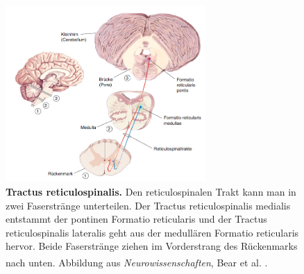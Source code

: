\documentclass[12pt,a4paper,pdftex]{article}
\begin{document}
\begin{figure}[H]
    \centering
    \includegraphics[width=0.68\textwidth]{pictures/Bilder_Laura/reticulospinaler_tract.PNG}
    \caption[Tractus reticulospinalis]{\textbf{Tractus reticulospinalis.} Den reticulospinalen Trakt kann man in zwei Faserstränge unterteilen. Der Tractus reticulospinalis medialis entstammt der pontinen Formatio reticularis und der Tractus reticulospinalis lateralis geht aus der medullären Formatio reticularis hervor. Beide Faserstränge ziehen im Vorderstrang des Rückenmarks nach unten. Abbildung aus \textit{Neurowissenschaften}, Bear et al. \textsuperscript{\cite[14]{neurowissenschaften_baer}}.}
    \label{fig:tr_reticulospinalis}
\end{figure}
\end{document}
